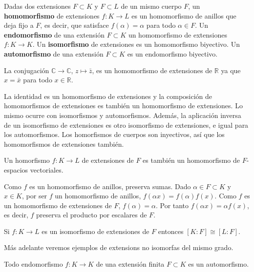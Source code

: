 

Dadas dos extensiones \(F\subset K\) y \(F\subset L\) de un mismo cuerpo
\(F\), un \textbf{homomorfismo} de extensiones
\(f\colon K\rightarrow L\) es un homomorfismo de anillos que deja fijo a
\(F\), es decir, que satisface \(f(\alpha)=\alpha\) para todo
\(\alpha\in F\). Un \textbf{endomorfismo} de una extensión
\(F\subset K\) un homomorfismo de extensiones
\(f\colon K\rightarrow K\). Un \textbf{isomorfismo} de extensiones es un
homomorfismo biyectivo. Un \textbf{automorfismo} de una extensión
\(F\subset K\) es un endomorfismo biyectivo. 

La conjugación \(\mathbb{C}\rightarrow \mathbb{C}\),
\(z\mapsto\bar{z}\), es un homomorfismo de extensiones de \(\mathbb{R}\)
ya que \(x=\bar{x}\) para todo \(x\in\mathbb{R}\).


La identidad es un homomorfismo de extensiones y la composición de
homomorfismos de extensiones es también un homomorfismo de extensiones.
Lo mismo ocurre con isomorfismos y automorfismos. Además, la aplicación
inversa de un isomorfismo de extensiones es otro isomorfismo de
extensiones, e igual para los automorfismos. Los homorfismos de cuerpos
son inyectivos, así que los homomorfismos de extensiones también.


Un homorfismo \(f\colon K\rightarrow L\) de extensiones de \(F\) es
también un homomorfismo de \(F\)-espacios vectoriales. 


Como \(f\) es un homomorfismo de anillos, preserva sumas. Dado
\(\alpha\in F\subset K\) y \(x\in K\), por ser \(f\) un homomorfismo de
anillos, \(f(\alpha x)=f(\alpha)f(x)\). Como \(f\) es un homomorfismo de
extensiones de \(F\), \(f(\alpha)=\alpha\). Por tanto
\(f(\alpha x)=\alpha f(x)\), es decir, \(f\) preserva el producto por
escalares de \(F\). 


Si \(f\colon K\rightarrow L\) es un isomorfismo de extensiones de \(F\)
entonces \([K:F]\cong [L:F]\). 

Más adelante veremos ejemplos de extensions no isomorfas del mismo
grado.


Todo endomorfismo \(f\colon K\rightarrow K\) de una extensión finita
\(F\subset K\) es un automorfismo. 

